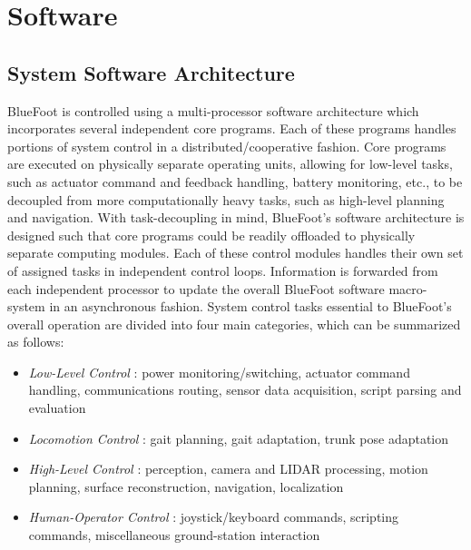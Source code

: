 
\chapter{Software}
	\label{ch::software}
	
	\section{System Software Architecture}
	
	BlueFoot is controlled using a multi-processor software architecture which incorporates several independent core programs. Each of these programs handles portions of system control in a distributed/cooperative fashion. Core programs are executed on physically separate operating units, allowing for low-level tasks, such as actuator command and feedback handling, battery monitoring, etc., to be decoupled from more computationally heavy tasks, such as high-level planning and navigation. With task-decoupling in mind, BlueFoot's software architecture is designed such that core programs could be readily offloaded to physically separate computing modules. Each of these control modules handles their own set of assigned tasks in independent control loops. Information is forwarded from each independent processor to update the overall BlueFoot software macro-system in an asynchronous fashion. System control tasks essential to BlueFoot's overall operation are divided into four main categories, which can be summarized as follows:
		\begin{itemize}
			\item{
			\emph{Low-Level Control} : 
				power monitoring/switching, 
				actuator command handling, 
				communications routing,
				sensor data acquisition,
				script parsing and evaluation
			}
			\item{
			\emph{Locomotion Control} : 
				gait planning, 
				gait adaptation, 
				trunk pose adaptation
			}
			\item{
			\emph{High-Level Control} : 
				perception,
				camera and LIDAR processing, 
				motion planning, 
				surface reconstruction, 
				navigation, 
				localization
			}
			\item{
			\emph{Human-Operator Control} : 
				joystick/keyboard commands,
				scripting commands,
				miscellaneous ground-station interaction
			}
		\end{itemize}
